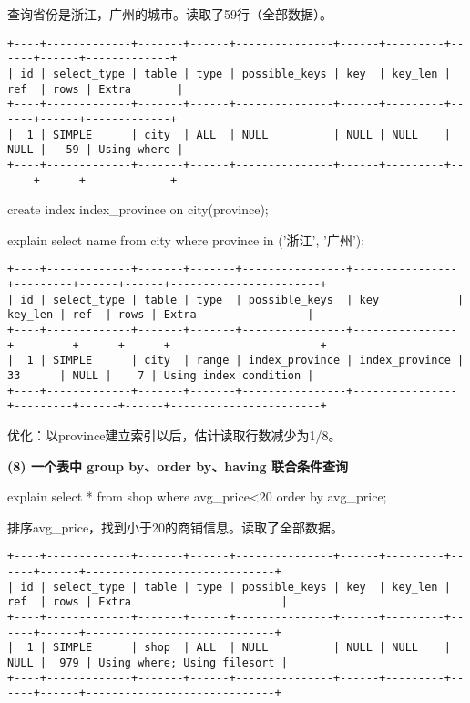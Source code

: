 \documentclass[a4paper, 11pt, nofonts, nocap, fancyhdr]{ctexart}
\begin{document}
查询省份是浙江，广州的城市。读取了59行（全部数据）。

\begin{verbatim}
+----+-------------+-------+------+---------------+------+---------+------+------+-------------+
| id | select_type | table | type | possible_keys | key  | key_len | ref  | rows | Extra       |
+----+-------------+-------+------+---------------+------+---------+------+------+-------------+
|  1 | SIMPLE      | city  | ALL  | NULL          | NULL | NULL    | NULL |   59 | Using where |
+----+-------------+-------+------+---------------+------+---------+------+------+-------------+
\end{verbatim}

create index index\_province on city(province);

explain select name from city where province in ('浙江', '广州');

\begin{verbatim}
+----+-------------+-------+-------+----------------+----------------+---------+------+------+-----------------------+
| id | select_type | table | type  | possible_keys  | key            | key_len | ref  | rows | Extra                 |
+----+-------------+-------+-------+----------------+----------------+---------+------+------+-----------------------+
|  1 | SIMPLE      | city  | range | index_province | index_province | 33      | NULL |    7 | Using index condition |
+----+-------------+-------+-------+----------------+----------------+---------+------+------+-----------------------+
\end{verbatim}

优化：以province建立索引以后，估计读取行数减少为1/8。

\vspace{0.7cm}

\textbf{(8) 一个表中 group by、order by、having 联合条件查询} 

explain select * from shop where avg\_price<20 order by avg\_price;

排序avg\_price，找到小于20的商铺信息。读取了全部数据。

\begin{verbatim}
+----+-------------+-------+------+---------------+------+---------+------+------+-----------------------------+
| id | select_type | table | type | possible_keys | key  | key_len | ref  | rows | Extra                       |
+----+-------------+-------+------+---------------+------+---------+------+------+-----------------------------+
|  1 | SIMPLE      | shop  | ALL  | NULL          | NULL | NULL    | NULL |  979 | Using where; Using filesort |
+----+-------------+-------+------+---------------+------+---------+------+------+-----------------------------+
\end{verbatim}
\end{document}
